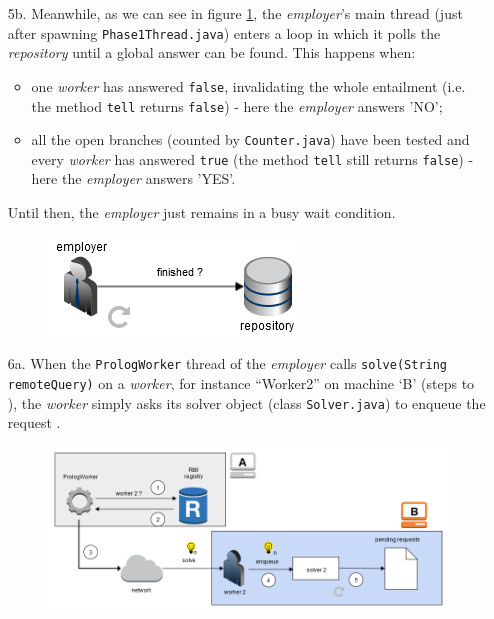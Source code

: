 \documentclass[a4paper, 11pt, oneside]{duthesis}
\newcommand*\circled[1]{\tikz[baseline=(char.base)]{
            \node[shape=circle,draw,inner sep=2pt] (char) {#1};}}
\begin{document}
\begin{enumerate}
\item[5b.] Meanwhile, as we can see in figure \ref{DIAG_8}, the \emph{employer}'s main thread (just after spawning \texttt{Phase1Thread.java}) enters a loop in which it polls the \emph{repository} until a global answer can be found. This happens when:
\begin{itemize}
\item one \emph{worker} has answered \texttt{false}, invalidating the whole entailment (i.e. the method \texttt{tell} returns \texttt{false}) - here the \emph{employer} answers 'NO';
\item all the open branches (counted by \texttt{Counter.java}) have been tested and every \emph{worker} has answered \texttt{true} (the method \texttt{tell} still returns \texttt{false}) - here the \emph{employer} answers 'YES'.
\end{itemize}
Until then, the \emph{employer} just remains in a busy wait condition.

\begin{figure}[H]
\centering
\includegraphics[scale=1.00]{img/DIAG_8.png}
\caption{}
\label{DIAG_8}
\end{figure}

\newpage

\item[6a.]When the \texttt{PrologWorker} thread of the \emph{employer} calls \texttt{solve(String remoteQuery)} on a \emph{worker}, for instance ``Worker2'' on machine `B' (steps \circled{1} to \circled{3}), the \emph{worker} simply asks its solver object (class \texttt{Solver.java}) to enqueue the request \circled{4}.

\begin{figure}[H]
\centering
\includegraphics[scale=.70]{img/DIAG_9.png}
\caption{}
\label{DIAG_9}
\end{figure}


\end{enumerate}
\end{document}
